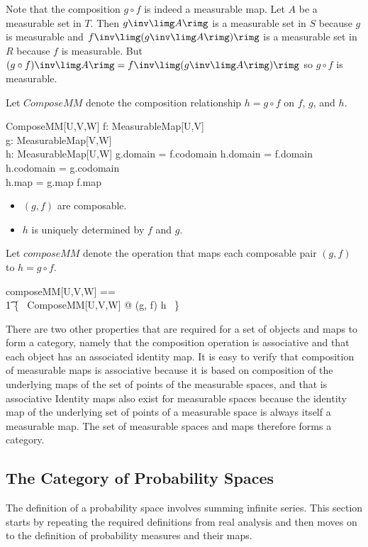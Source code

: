 \documentclass{article}
\begin{document}
Note that the composition $g \circ f$ is indeed a measurable map. 
Let $A$ be a measurable set in $T$.
Then $g\inv\limg A \rimg$ is a measurable set in $S$ because $g$ is measurable
and $f\inv\limg (g\inv\limg A \rimg) \rimg$ is a measurable set in $R$ because $f$ is measurable.
But $(g\circ f)\inv\limg A \rimg = f\inv\limg (g\inv\limg A \rimg) \rimg$ so $g \circ f$ is measurable.
 
Let $ComposeMM$ denote the composition relationship $h = g \circ f$ on $f$, $g$, and $h$.
\begin{schema}{ComposeMM}[U,V,W]
	f: MeasurableMap[U,V] \\
	g: MeasurableMap[V,W] \\
	h: MeasurableMap[U,W]
\where
	g.domain = f.codomain
\also
	h.domain = f.domain \\
	h.codomain = g.codomain \\
	h.map = g.map \circ f.map
\end{schema}
\begin{itemize}
\item $(g, f)$ are composable.
\item $h$ is uniquely determined by $f$ and $g$.
\end{itemize}

Let $composeMM$ denote the operation that maps each composable pair $(g,f)$ to $h = g \circ f$.
\begin{zed}
	composeMM[U,V,W] == \\
\t1		\{~  ComposeMM[U,V,W] @ (g, f) \mapsto h ~\}
\end{zed}
 
There are two other properties that are required for a set of objects and maps to form a category, namely that the composition operation
is associative and that each object has an associated identity map.
It is easy to verify that composition of measurable maps is associative because it is based on composition of the underlying
maps of the set of points of the measurable spaces, and that is associative
Identity maps also exist for measurable spaces because the identity map of the underlying set of points of a measurable space is always itself a measurable map. The set of measurable spaces and maps therefore forms a category.

\subsection{The Category of Probability Spaces}

The definition of a probability space involves summing infinite series.
This section starts by repeating the required definitions from real analysis and
then moves on to the definition of probability measures and their maps.
\end{document}
